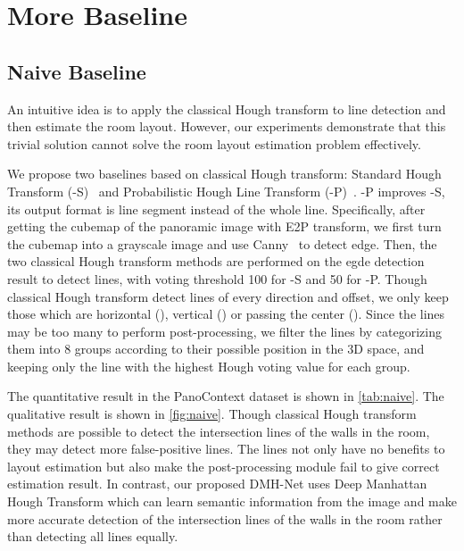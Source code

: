 \documentclass[runningheads]{llncs}
\begin{document}
\section{More Baseline}
\subsection{Naive Baseline}
An intuitive idea is to apply the classical Hough transform to line detection and then estimate the room layout. However, our experiments demonstrate that this trivial solution cannot solve the room layout estimation problem effectively.

We propose two baselines based on classical Hough transform: Standard Hough Transform (-S)~\cite{hough1962method} and Probabilistic Hough Line Transform (-P)~\cite{matas2000robust}. 
-P improves -S, its output format is line segment instead of the whole line.
Specifically, after getting the cubemap of the panoramic image with E2P transform, we first turn the cubemap into a grayscale image and use Canny~\cite{canny1986computational} to detect edge. Then, the two classical Hough transform methods are performed on the egde detection result to detect lines, with voting threshold 100 for -S and 50 for -P. Though classical Hough transform detect lines of every direction and offset, we only keep those which are horizontal (), vertical () or passing the center (). 
Since the lines may be too many to perform post-processing, we filter the lines by categorizing them into 8 groups according to their possible position in the 3D space, and keeping only the line with the highest Hough voting value for each group.

The quantitative result in the PanoContext dataset\cite{zhang2014panocontext} is shown in \cref{tab:naive}. The qualitative result is shown in \cref{fig:naive}. 
Though classical Hough transform methods are possible to detect the intersection lines of the walls in the room, they may detect more false-positive lines. The lines not only have no benefits to layout estimation but also make the post-processing module fail to give correct estimation result. In contrast, our proposed DMH-Net uses Deep Manhattan Hough Transform which can learn semantic information from the image and make more accurate detection of the intersection lines of the walls in the room rather than detecting all lines equally. 
\end{document}
